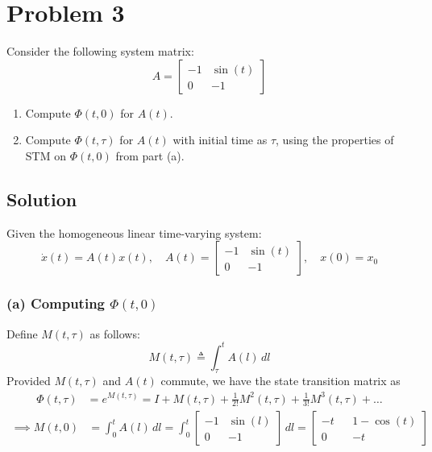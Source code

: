 \section*{Problem 3}
\setcounter{section}{3}

Consider the following system matrix:
\begin{equation*}
    A
    =
    \begin{bmatrix}
        -1 & \sin(t) \\
        0  & -1
    \end{bmatrix}
\end{equation*}
\begin{enumerate}[label= (\alph*)]
    \item Compute \( \Phi(t, 0) \) for \( A(t) \).
    \item Compute \( \Phi(t, \tau) \) for \( A(t) \) with initial time as \( \tau \), using the properties of STM on \( \Phi(t, 0) \) from part (a).
\end{enumerate}

\subsection*{Solution}

Given the homogeneous linear time-varying system:
\begin{equation*}
    \dot{x}(t) = A(t) x(t),
    \quad
    A(t)
    =
    \begin{bmatrix}
        -1 & \sin(t) \\
        0  & -1
    \end{bmatrix},
    \quad
    x(0) = x_0
\end{equation*}

\subsubsection*{(a) Computing \( \Phi(t, 0) \)}

Define \( M(t, \tau) \) as follows:
\begin{equation}\label{eq:M(t, tau)}
    M(t, \tau)
    \triangleq
    \int_{\tau}^{t} A(l) \, dl
\end{equation}
Provided \( M(t, \tau) \) and \( A(t) \) commute, we have the state transition matrix as
\begin{align*}
    \Phi(t, \tau)
     & =
    e^{M(t, \tau)}
    =
    I + M(t, \tau) + \frac{1}{2!} M^2(t, \tau) + \frac{1}{3!} M^3(t, \tau) + \ldots
\end{align*}
\begin{align*}
    \implies
    M(t, 0)
     & =
    \int_{0}^{t} A(l) \, dl
    =
    \int_{0}^{t}
    \begin{bmatrix}
        -1 & \sin(l) \\
        0  & -1
    \end{bmatrix}
    \, dl
    =
    \begin{bmatrix}
        -t &  & 1 - \cos(t) \\
        0  &  & -t
    \end{bmatrix}
\end{align*}


